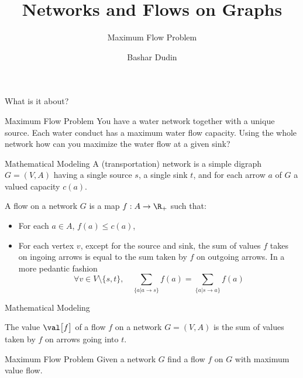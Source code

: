 \documentclass[32pt, aspectratio=169]{beamer}
\author[BD]{Bashar Dudin}
\institute[]{EPITA}
\title{Networks and Flows on Graphs} %
\subtitle{Maximum Flow Problem}
\begin{document}
\begin{frame}[plain]
\titlepage %
\end{frame}

\begin{frame}{What is it about?}
  \begin{halfshyblock}{Maximum Flow Problem}
    You have a water network together with a unique source. Each water
    conduct has a maximum water flow capacity. Using the whole network
    how can you maximize the water flow at a given sink?
  \end{halfshyblock}
\end{frame}

\begin{frame}{Mathematical Modeling}
  A (transportation) network is a simple digraph $G = (V, A)$ having a
  single source $s$, a single sink $t$, and for each arrow $a$ of $G$
  a valued capacity $c(a)$.
  \pause
  \begin{defn}
    A flow on a network $G$ is a map $f: A \to \R_+$ such that:
    \begin{itemize}
    \item For each $a \in A$, $f(a) \leq c(a)$,
    \item For each vertex $v$, except for the source and sink, the sum
      of values $f$ takes on ingoing arrows is equal to the sum taken
      by $f$ on outgoing arrows. In a more pedantic fashion
      \begin{displaymath}
        \forall v \in V\setminus \{s, t\}, \quad \sum_{\{a | a \to s\}} f(a) = \sum_{\{a | s \to a\}}f(a)
      \end{displaymath}
    \end{itemize}
  \end{defn}
\end{frame}

\begin{frame}{Mathematical Modeling}
  \begin{defn}
    The value $\val\big[f\big]$ of a flow $f$ on a network $G = (V, A)$ is the
    sum of values taken by $f$ on arrows going into $t$.
  \end{defn}
  \pause
  \begin{halfshyblock}{Maximum Flow Problem}
    Given a network $G$ find a flow $f$ on $G$ with maximum value
    flow.
  \end{halfshyblock}
\end{frame}
\end{document}
